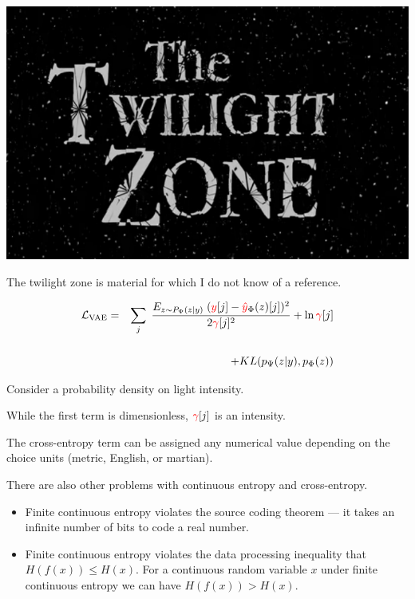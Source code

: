 {\centerline{\includegraphics[width = 6in]{../images/Twilight}}

\vfill
The twilight zone is material for which I do not know of a reference. 


\bigskip
\begin{eqnarray*}
{\cal L}_{\mathrm{VAE}} & = & \sum_j\;\frac{E_{z \sim P_\Psi(z|y)}\;
({\color{red}y}[j] - {\color{red} \hat{y}}_\Phi(z)[j])^2}{2{\color{red} \gamma}[j]^2}
+ \ln {\color{red} \gamma}[j] \\
\\
& & + KL(p_\Psi(z|y),p_\Phi(z))
\end{eqnarray*}

\vfill Consider a probability density on light intensity.

\vfill
While the first term is dimensionless, ${\color{red} \gamma}[j]$ is an intensity.

\vfill
{\color{red} The cross-entropy term can be assigned any numerical value depending on the choice units (metric, English, or martian).}


There are also other problems with continuous entropy and cross-entropy.

\vfill
\begin{itemize}
\item Finite continuous entropy violates the source coding theorem --- it takes an infinite number of bits to code a real number.

\vfill
\item Finite continuous entropy violates the data processing inequality that $H(f(x)) \leq H(x)$.  For a continuous random variable $x$ under finite continuous entropy we can have $H(f(x)) > H(x)$.
\end{itemize}

}
